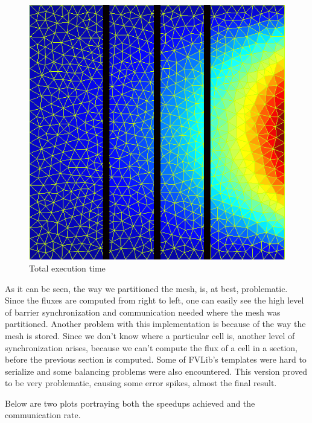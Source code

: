 \documentclass[a4paper,10pt,openright,openbib,twocolumn]{article}
\begin{document}
\begin{figure}[H]
    \centering
    \begin{minipage}[t]{\columnwidth}
        \includegraphics[width=\textwidth]{../images/mesh_vertical.png}
        \caption{Total execution time \label{fig:total}}
    \end{minipage}
\end{figure}

As it can be seen, the way we partitioned the mesh, is, at best, problematic. Since the fluxes are computed from right to left, one can easily see the high level of barrier synchronization and communication needed where the mesh was partitioned. Another problem with this implementation is because of the way the mesh is stored. Since we don't know where a particular cell is, another level of synchronization arises, because we can't compute the flux of a cell in a section, before the previous section is computed. 
Some of FVLib's templates were hard to serialize and some balancing problems were also encountered. This version proved to be very problematic, causing some error spikes, almost the final result.

Below are two plots portraying both the speedups achieved and the communication rate. 
\end{document}
